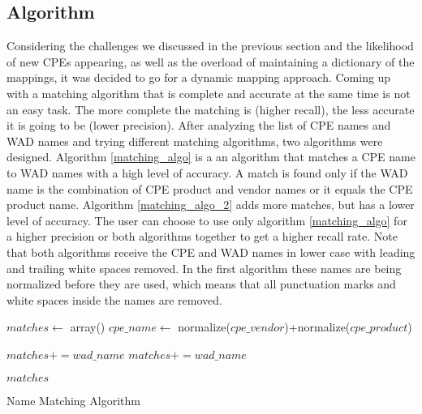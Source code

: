 \subsection{Algorithm}


Considering the challenges we discussed in the previous section and the likelihood of new CPEs appearing, as well as the overload of maintaining a dictionary of the mappings, it was decided to go for a dynamic mapping approach. 
\pragraph{}
Coming up with a matching algorithm that is complete and accurate at the same time is not an easy task. The more complete the matching is (higher recall), the less accurate it is going to be (lower precision). After analyzing the list of CPE names and WAD names and trying different matching algorithms, two algorithms were designed. Algorithm \ref{matching_algo} is a an algorithm that matches a CPE name to WAD names with a high level of accuracy. A match is found only if the WAD name is the combination of CPE product and vendor names or it equals the CPE product name. Algorithm \ref{matching_algo_2} adds more matches, but has a lower level of accuracy. The user can choose to use only algorithm \ref{matching_algo} for a higher precision or both algorithms together to get a higher recall rate. Note that both algorithms receive the CPE and WAD names in lower case with leading and trailing white spaces removed. In the first algorithm these names are being normalized before they are used, which means that all punctuation marks and white spaces inside the names are removed.  
\begin{algorithm}
\begin{algorithmic}
\STATE $matches\gets$ array()
\STATE $cpe\_name\gets$ normalize($cpe\_vendor$)+normalize($cpe\_product$)


		\STATE $matches+=wad\_name$
		\STATE $matches+=wad\_name$
		
		\ENDIF
\ENDFOR
\RETURN $matches$
%
%
%

\end{algorithmic}
\caption{Name Matching Algorithm}
\label{matching_algo}
\end{algorithm}

